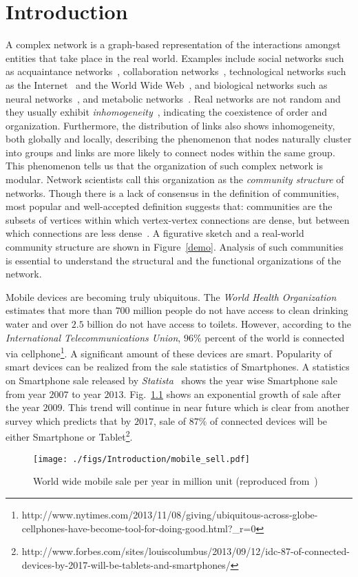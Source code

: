 \chapter[Introduction]{Introduction}
A complex network is a graph-based representation of the interactions amongst entities that take place in the real world. Examples include
social
networks such as acquaintance networks~\cite{Amaral},
collaboration networks~\cite{newman_01}, technological networks such as the
Internet~\cite{Faloutsos:1999} and the World Wide Web~\cite{albert1999internet}, and biological networks such as neural
networks~\cite{Watts-1998}, and metabolic networks~\cite{Jeong}. Real networks are
not random and they usually exhibit {\em inhomogeneity}~\cite{Barabasi99}, indicating the coexistence of order and organization.
Furthermore, the
distribution of links also shows inhomogeneity, both globally and locally, describing the phenomenon that
nodes naturally cluster into groups and links are more likely to connect nodes within the same group. This phenomenon tells us that the
organization of such complex network is modular. Network scientists call this organization as the {\it community structure} of networks. Though
there is a lack
of consensus in the definition of communities, most popular and well-accepted definition suggests that: communities are the subsets of
vertices within which vertex-vertex connections are dense, but between which connections are less dense~\cite{Girvan02}. A figurative
sketch and a real-world community structure are shown in Figure~\ref{demo}. Analysis of such communities is essential to understand the
structural and the functional organizations of the network.   

Mobile devices are becoming truly ubiquitous. The {\em World Health Organization} estimates that more than $700$ million people do not have access to clean drinking water and over $2.5$ billion do not have access to toilets. However, according to the {\em International Telecommunications Union}, $96\%$ percent of the world is connected via cellphone\footnote{http://www.nytimes.com/2013/11/08/giving/ubiquitous-across-globe-cellphones-have-become-tool-for-doing-good.html?\_r=0}. A significant amount of these devices are smart. Popularity of smart devices can be realized from the sale statistics of Smartphones. A statistics on Smartphone sale released by {\em Statista}~\cite{mobile_sell_stat_statistica} shows the year wise Smartphone sale from year $2007$ to year $2013$.  Fig.~\ref{mobile_sell} shows an exponential growth of sale after the year $2009$. This trend will continue in near future which is clear from another survey which predicts that by $2017$, sale of $87\%$ of connected devices will be either 
Smartphone or Tablet\footnote{http://www.forbes.com/sites/louiscolumbus/2013/09/12/idc-87-of-connected-devices-by-2017-will-be-tablets-and-smartphones/}. 
\begin{figure}[h!t]
\begin{center}
\texttt{[image: ./figs/Introduction/mobile\_sell.pdf]}
\caption{World wide mobile sale per year in million unit (reproduced from~\cite{mobile_sell_stat_statistica})}
\label{mobile_sell}
\end{center}
\end{figure}
\fi

